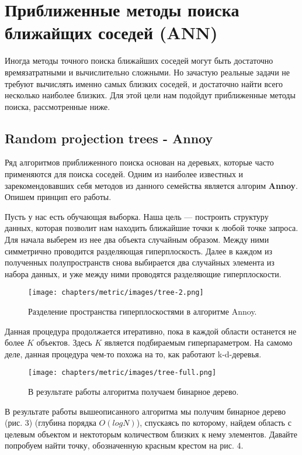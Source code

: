 \section*{Приближенные методы поиска ближайщих соседей (ANN)}

Иногда методы точного поиска ближайших соседей могут быть достаточно времязатратными и вычислительно сложными. Но зачастую реальные задачи не требуют вычислять именно самых близких соседей, и достаточно найти всего несколько наиболее близких. Для этой цели нам подойдут приближенные методы поиска, рассмотренные ниже.

\subsection{Random projection trees - \textbf{Annoy}}

Ряд алгоритмов приближенного поиска основан на деревьях, которые часто применяются для поиска соседей. Одним из наиболее известных и зарекомендовавших себя методов из данного семейства является алгорим \textbf{Annoy}. Опишем принцип его работы.

Пусть у нас есть обучающая выборка. Наша цель — построить структуру данных, которая позволит нам находить ближайшие точки к любой точке запроса. Для начала выберем из нее два объекта случайным образом. Между ними симметрично проводится разделяющая гиперплоскость. Далее в каждом из полученных полупространств снова выбирается два случайных элемента из набора данных, и уже между ними проводятся разделяющие гиперплоскости.

\begin{figure}[ht]
    \centering
    \texttt{[image: chapters/metric/images/tree-2.png]}
    \caption{Разделение пространства гиперплоскостями в алгоритме Annoy.}
    \label{fig:annoy}
\end{figure}

Данная процедура продолжается итеративно, пока в каждой области останется не более $K$ объектов. Здесь $K$ является подбираемым гиперпараметром. На самомо деле, данная процедура чем-то похожа на то, как работают k-d-деревья.

\begin{figure}[ht]
    \centering
    \texttt{[image: chapters/metric/images/tree-full.png]}
    \caption{В результате работы алгоритма получаем бинарное дерево.}
    \label{fig:full-tree}
\end{figure}

В результате работы вышеописанного алгоритма мы получим бинарное дерево (рис. 3) (глубина порядка $O(logN)$), спускаясь по которому, найдем область с целевым объектом и нектоторым количеством близких к нему элементов. Давайте попробуем найти точку, обозначенную красным крестом на рис. 4.

